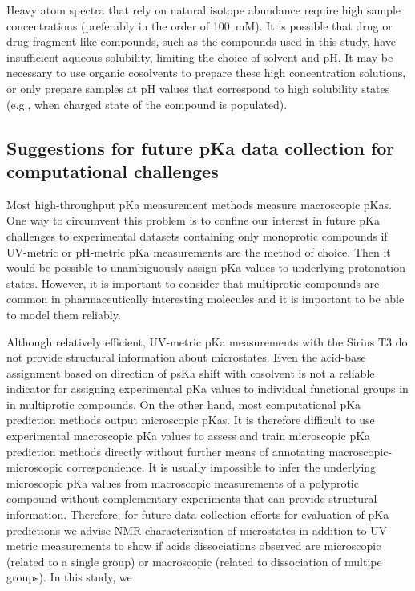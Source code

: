 \documentclass[9pt,lineno]{elife}
\begin{document}
Heavy atom spectra that rely on natural isotope abundance require high sample concentrations (preferably in the order of 100~mM). It is possible that drug or drug-fragment-like compounds, such as the compounds used in this study, have insufficient aqueous solubility, limiting the choice of solvent and pH. 
It may be necessary to use organic cosolvents to prepare these high concentration solutions, or only prepare samples at pH values that correspond to high solubility states (e.g., when charged state of the compound is populated). 

\subsection{Suggestions for future pKa data collection for computational challenges}

Most high-throughput pKa measurement methods measure macroscopic pKas. 
One way to circumvent this problem is to confine our interest in future pKa challenges to experimental datasets containing only monoprotic compounds if UV-metric or pH-metric pKa measurements are the method of choice. 
Then it would be possible to unambiguously assign pKa values to underlying protonation states. 
However, it is important to consider that multiprotic compounds are common in pharmaceutically interesting molecules and it is important to be able to model them reliably.

Although relatively efficient, UV-metric pKa measurements with the Sirius T3 do not provide structural information about microstates. 
Even the acid-base assignment based on direction of psKa shift with cosolvent is not a reliable indicator for assigning experimental pKa values to individual functional groups in in multiprotic compounds. 
On the other hand, most computational pKa prediction methods output microscopic pKas. 
It is therefore difficult to use experimental macroscopic pKa values to assess and train microscopic pKa prediction methods directly without further means of annotating macroscopic-microscopic correspondence. 
It is usually impossible to infer the underlying microscopic pKa values from macroscopic measurements of a polyprotic compound without complementary experiments that can provide structural information. Therefore, for future data collection efforts for evaluation of pKa predictions we advise NMR characterization of microstates in addition to UV-metric measurements to show if acids dissociations observed are microscopic (related to a single group) or macroscopic (related to dissociation of multipe groups). In this study, we 
\end{document}
